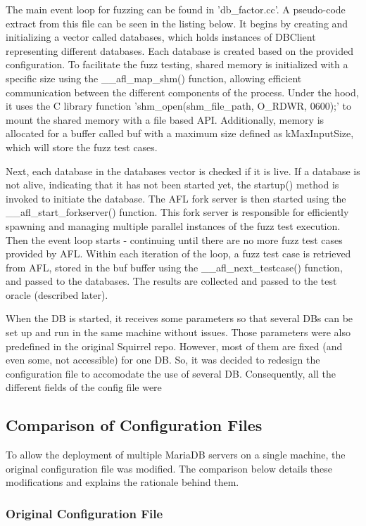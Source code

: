 \documentclass[sigconf]{acmart}
\begin{document}
The main event loop for fuzzing can be found in 'db\_factor.cc'. A pseudo-code extract from this file can be seen in the listing below. It begins by creating and initializing a vector called databases, which holds instances of DBClient representing different databases. Each database is created based on the provided configuration. To facilitate the fuzz testing, shared memory is initialized with a specific size using the \_\_afl\_map\_shm() function, allowing efficient communication between the different components of the process. Under the hood, it uses the C library function 'shm\_open(shm\_file\_path, O\_RDWR, 0600);' to mount the shared memory with a file based API. Additionally, memory is allocated for a buffer called buf with a maximum size defined as kMaxInputSize, which will store the fuzz test cases.

Next, each database in the databases vector is checked if it is live. If a database is not alive, indicating that it has not been started yet, the startup() method is invoked to initiate the database. The AFL fork server is then started using the \_\_afl\_start\_forkserver() function. This fork server is responsible for efficiently spawning and managing multiple parallel instances of the fuzz test execution. Then the event loop starts - continuing until there are no more fuzz test cases provided by AFL. Within each iteration of the loop, a fuzz test case is retrieved from AFL, stored in the buf buffer using the \_\_afl\_next\_testcase() function, and passed to the databases. The results are collected and passed to the test oracle (described later).


When the DB is started, it receives some parameters so that several DBs can be set up and run in the same machine without issues. Those parameters were also predefined in the original Squirrel repo. However, most of them are fixed (and even some, not accessible) for one DB. So, it was decided to redesign the configuration file to accomodate the use of several DB. Consequently, all the different fields of the config file were 
\subsection{Comparison of Configuration Files}

To allow the deployment of multiple MariaDB servers on a single machine, the original configuration file was modified. The comparison below details these modifications and explains the rationale behind them.

\subsubsection{Original Configuration File}
\end{document}
